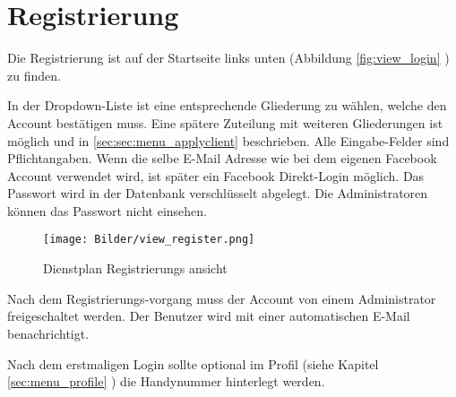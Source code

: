 \chapter{Registrierung}
\label{cha:register}

Die Registrierung ist auf der Startseite links unten (Abbildung  \ref{fig:view_login} \textit{}) zu finden.

\vspace*{5mm} \noindent In der Dropdown-Liste ist eine entsprechende Gliederung zu wählen, welche den Account bestätigen muss. Eine spätere Zuteilung mit weiteren Gliederungen ist möglich und in \ref{sec:sec:menu_applyclient} \textit{} beschrieben. Alle Eingabe-Felder sind Pflichtangaben. Wenn die selbe E-Mail Adresse wie bei dem eigenen Facebook Account verwendet wird, ist später ein Facebook Direkt-Login möglich. Das Passwort wird in der Datenbank verschlüsselt abgelegt. Die Administratoren können das Passwort nicht einsehen.

\begin{figure}[h]
 \begin{addmargin}{-0.2\linewidth}
   \centering 
   \texttt{[image: Bilder/view\_register.png]}
 \end{addmargin} 
 \caption[Registrierungs ansicht]{Dienstplan Registrierungs ansicht}
 \label{fig:view_register}
\end{figure}

\vspace*{5mm} \noindent 
Nach dem Registrierungs-vorgang muss der Account von einem Administrator freigeschaltet werden. Der Benutzer wird mit einer automatischen E-Mail benachrichtigt.

\noindent Nach dem erstmaligen Login sollte optional im Profil (siehe Kapitel \ref{sec:menu_profile} \textit{}) die Handynummer hinterlegt werden.